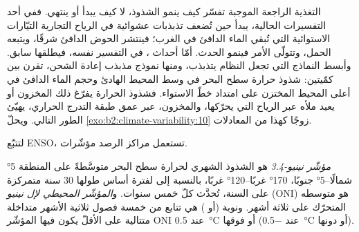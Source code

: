 \begin{omfigure}
\centering
{}
\par{}
\end{omfigure}

التغذية الراجعة الموجبة تفسّر كيف ينمو الشذوذ، لا كيف يبدأ أو ينتهي. ففي أحد التفسيرات الحالية،
يبدأ  حين تُضعف تذبذبات عشوائية في الرياح التجارية التيّارات الاستوائية التي
تُبقي الماء الدافئ في الغرب؛ فينتشر الحوض الدافئ شرقًا، ويتبعه الحمل،
وتتولّى  الأمر فينمو الحدث. أمّا أحداث ، في التفسير نفسه، فيطلقها
 سابق. وأبسط النماذج التي تجعل النظام يتذبذب، ومنها نموذج مذبذب
إعادة الشحن، تقرن بين كمّيتين: شذوذ حرارة سطح البحر في وسط
المحيط الهادئ وحجم الماء الدافئ في أعلى المحيط المختزن على امتداد خطّ الاستواء. فشذوذ الحرارة
يفرّغ ذلك المخزون أو يعيد ملأه عبر الرياح التي يحرّكها، والمخزون، عبر
عمق طبقة التدرج الحراري، يهيّئ الطور التالي. ويحلّ \cref{exo:b2:climate-variability:10}
زوجًا كهذا من المعادلات.

لتتبّع ENSO، تستعمل مراكز الرصد مؤشّرات.

\begin{definition}\label{def:b2:climate-variability:oni}
\emph{مؤشّر نينيو-3.4} هو الشذوذ الشهري لحرارة سطح
البحر متوسَّطةً على المنطقة \ang{5} شمالًا--\ang{5} جنوبًا، \ang{170} غربًا--\ang{120} غربًا، بالنسبة إلى
 لفترة أساس طولها 30 سنة متمركزة على السنة، تُحدَّث كلّ خمس سنوات.
و\emph{المؤشّر المحيطي لإل نينيو} (ONI) هو متوسطه المتحرّك على ثلاثة أشهر. ونوبة
 (أو ) هي تتابع من خمسة فصول ثلاثية الأشهر متداخلة متتالية على الأقلّ
يكون فيها المؤشّر ONI عند \qty{+0.5}{\celsius} أو فوقها (عند \qty{-0.5}{\celsius} أو دونها).
\end{definition}

